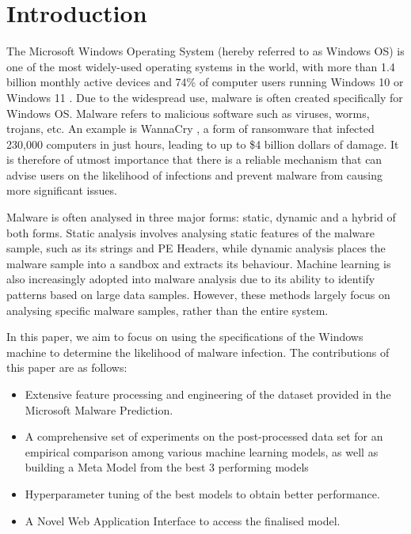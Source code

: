 \documentclass[runningheads]{llncs}
\begin{document}
\section{Introduction}
\par 
The Microsoft Windows Operating System (hereby referred to as Windows OS) is one of the most widely-used operating systems in the world, with more than 1.4 billion monthly active devices and 74\% of computer users running Windows 10 or Windows 11 \cite{microsoftahaha}. Due to the widespread use, malware is often created specifically for Windows OS. Malware refers to malicious software such as viruses, worms, trojans, etc. An example is WannaCry \cite{kaspersky_2022}, a form of ransomware that infected 230,000 computers in just hours, leading to up to \$4 billion dollars of damage. It is therefore of utmost importance that there is a reliable mechanism that can advise users on the likelihood of infections and prevent malware from causing more significant issues.

\par
Malware is often analysed in three major forms: static, dynamic and a hybrid of both forms. Static analysis involves analysing static features of the malware sample, such as its strings and PE Headers, while dynamic analysis places the malware sample into a sandbox and extracts its behaviour. Machine learning is also increasingly adopted into malware analysis due to its ability to identify patterns based on large data samples. However, these methods largely focus on analysing specific malware samples, rather than the entire system.

\par
In this paper, we aim to focus on using the specifications of the Windows machine to determine the likelihood of malware infection. The contributions of this paper are as follows:
\begin{itemize}
\item  Extensive feature processing and engineering of the dataset provided in the Microsoft Malware Prediction.
\item A comprehensive set of experiments on the post-processed data set for an empirical comparison among various machine learning models, as well as building a Meta Model from the best 3 performing models
\item Hyperparameter tuning of the best models to obtain better performance.
\item A Novel Web Application Interface to access the finalised model.
\end{itemize}
\end{document}
